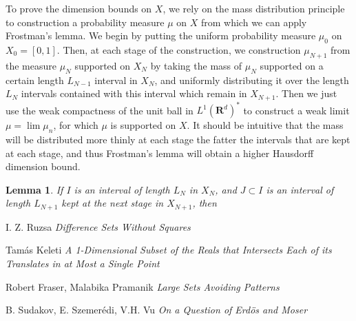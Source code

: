 \documentclass{article}
\theoremstyle{plain}
\newtheorem{lemma}{Lemma}
\theoremstyle{plain}
\begin{document}
\begin{multicols}{2}
To prove the dimension bounds on $X$, we rely on the mass distribution principle to construction a probability measure $\mu$ on $X$ from which we can apply Frostman's lemma. We begin by putting the uniform probability measure $\mu_0$ on $X_0 = [0,1]$. Then, at each stage of the construction, we construction $\mu_{N+1}$ from the measure $\mu_N$ supported on $X_N$ by taking the mass of $\mu_N$ supported on a certain length $L_{N-1}$ interval in $X_N$, and uniformly distributing it over the length $L_N$ intervals contained with this interval which remain in $X_{N+1}$. Then we just use the weak compactness of the unit ball in $L^1(\mathbf{R}^d)^*$ to construct a weak limit $\mu = \lim \mu_n$, for which $\mu$ is supported on $X$. It should be intuitive that the mass will be distributed more thinly at each stage the fatter the intervals that are kept at each stage, and thus Frostman's lemma will obtain a higher Hausdorff dimension bound.

\begin{lemma}
	If $I$ is an interval of length $L_N$ in $X_N$, and $J \subset I$ is an interval of length $L_{N+1}$ kept at the next stage in $X_{N+1}$, then
\end{lemma}

\end{multicols}

\begin{thebibliography}{9}

I. Z. Ruzsa
\textit{Difference Sets Without Squares}

Tam\'{a}s Keleti
\textit{A 1-Dimensional Subset of the Reals that Intersects Each of its Translates in at Most a Single Point}

Robert Fraser, Malabika Pramanik
\textit{Large Sets Avoiding Patterns}

B. Sudakov, E. Szemer\'{e}di, V.H. Vu
\textit{On a Question of Erd\"{o}s and Moser}

\end{thebibliography}


\end{document}
